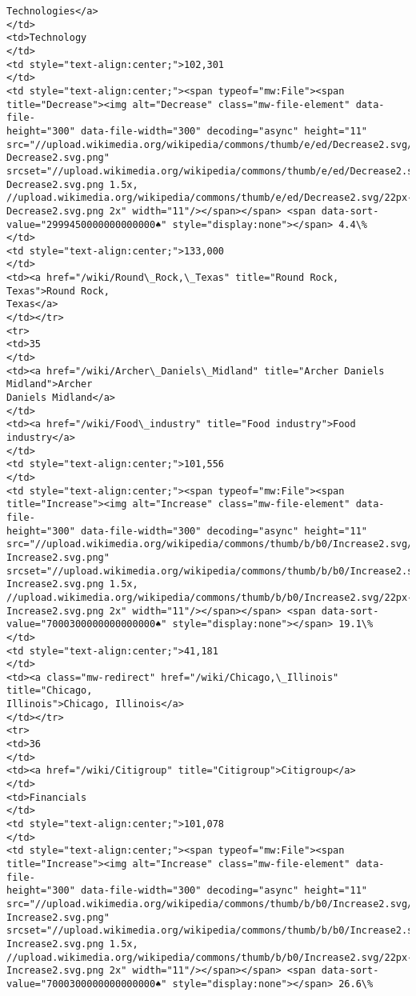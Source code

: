 \documentclass[11pt]{article}
\begin{document}
\begin{Verbatim}[commandchars=\\\{\}]
Technologies</a>
</td>
<td>Technology
</td>
<td style="text-align:center;">102,301
</td>
<td style="text-align:center;"><span typeof="mw:File"><span
title="Decrease"><img alt="Decrease" class="mw-file-element" data-file-
height="300" data-file-width="300" decoding="async" height="11"
src="//upload.wikimedia.org/wikipedia/commons/thumb/e/ed/Decrease2.svg/11px-
Decrease2.svg.png"
srcset="//upload.wikimedia.org/wikipedia/commons/thumb/e/ed/Decrease2.svg/17px-
Decrease2.svg.png 1.5x,
//upload.wikimedia.org/wikipedia/commons/thumb/e/ed/Decrease2.svg/22px-
Decrease2.svg.png 2x" width="11"/></span></span> <span data-sort-
value="2999450000000000000♠" style="display:none"></span> 4.4\%
</td>
<td style="text-align:center;">133,000
</td>
<td><a href="/wiki/Round\_Rock,\_Texas" title="Round Rock, Texas">Round Rock,
Texas</a>
</td></tr>
<tr>
<td>35
</td>
<td><a href="/wiki/Archer\_Daniels\_Midland" title="Archer Daniels Midland">Archer
Daniels Midland</a>
</td>
<td><a href="/wiki/Food\_industry" title="Food industry">Food industry</a>
</td>
<td style="text-align:center;">101,556
</td>
<td style="text-align:center;"><span typeof="mw:File"><span
title="Increase"><img alt="Increase" class="mw-file-element" data-file-
height="300" data-file-width="300" decoding="async" height="11"
src="//upload.wikimedia.org/wikipedia/commons/thumb/b/b0/Increase2.svg/11px-
Increase2.svg.png"
srcset="//upload.wikimedia.org/wikipedia/commons/thumb/b/b0/Increase2.svg/17px-
Increase2.svg.png 1.5x,
//upload.wikimedia.org/wikipedia/commons/thumb/b/b0/Increase2.svg/22px-
Increase2.svg.png 2x" width="11"/></span></span> <span data-sort-
value="7000300000000000000♠" style="display:none"></span> 19.1\%
</td>
<td style="text-align:center;">41,181
</td>
<td><a class="mw-redirect" href="/wiki/Chicago,\_Illinois" title="Chicago,
Illinois">Chicago, Illinois</a>
</td></tr>
<tr>
<td>36
</td>
<td><a href="/wiki/Citigroup" title="Citigroup">Citigroup</a>
</td>
<td>Financials
</td>
<td style="text-align:center;">101,078
</td>
<td style="text-align:center;"><span typeof="mw:File"><span
title="Increase"><img alt="Increase" class="mw-file-element" data-file-
height="300" data-file-width="300" decoding="async" height="11"
src="//upload.wikimedia.org/wikipedia/commons/thumb/b/b0/Increase2.svg/11px-
Increase2.svg.png"
srcset="//upload.wikimedia.org/wikipedia/commons/thumb/b/b0/Increase2.svg/17px-
Increase2.svg.png 1.5x,
//upload.wikimedia.org/wikipedia/commons/thumb/b/b0/Increase2.svg/22px-
Increase2.svg.png 2x" width="11"/></span></span> <span data-sort-
value="7000300000000000000♠" style="display:none"></span> 26.6\%

\end{Verbatim}
\end{document}
